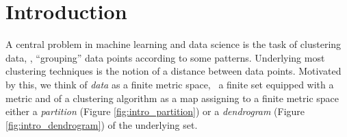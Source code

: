 \chapter*{Introduction}

A central problem in machine learning and data science is the task of clustering data, \ie, ``grouping'' data points according to some patterns.
Underlying most clustering techniques is the notion of a distance between data points. Motivated by this, we think of \emph{data} as a finite metric space, \ie\ a finite set equipped with a metric and of a clustering algorithm as a map assigning to a finite metric space either a \emph{partition} (Figure \ref{fig:intro_partition}) or a \emph{dendrogram} (Figure \ref{fig:intro_dendrogram}) of the underlying set.

